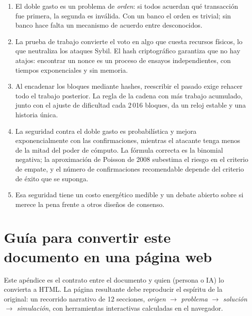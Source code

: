 \documentclass[11pt,a4paper]{article}
\newcommand{\webhint}[1]{}
\begin{document}
\begin{enumerate}[leftmargin=1.6em,itemsep=3pt]
  \item El doble gasto es un problema de \emph{orden}: si todos acuerdan qué transacción fue primera, la segunda es inválida. Con un banco el orden es trivial; sin banco hace falta un mecanismo de acuerdo entre desconocidos.
  \item La prueba de trabajo convierte el voto en algo que cuesta recursos físicos, lo que neutraliza los ataques Sybil. El hash criptográfico garantiza que no hay atajos: encontrar un nonce es un proceso de ensayos independientes, con tiempos exponenciales y sin memoria.
  \item Al encadenar los bloques mediante hashes, reescribir el pasado exige rehacer todo el trabajo posterior. La regla de la cadena con más trabajo acumulado, junto con el ajuste de dificultad cada 2\,016 bloques, da un reloj estable y una historia única.
  \item La seguridad contra el doble gasto es probabilística y mejora exponencialmente con las confirmaciones, mientras el atacante tenga menos de la mitad del poder de cómputo. La fórmula correcta es la binomial negativa; la aproximación de Poisson de 2008 subestima el riesgo en el criterio de empate, y el número de confirmaciones recomendable depende del criterio de éxito que se suponga.
  \item Esa seguridad tiene un costo energético medible y un debate abierto sobre si merece la pena frente a otros diseños de consenso.
\end{enumerate}

\appendix

\section{Guía para convertir este documento en una página web}\label{app:web}
\webhint{section; id=app-web; slug=guia-web; kicker=apéndice; role=meta; render=false}

Este apéndice es el contrato entre el documento y quien (persona o IA) lo convierta a HTML. La página resultante debe reproducir el espíritu de la original: un recorrido narrativo de 12 secciones, \emph{origen $\rightarrow$ problema $\rightarrow$ solución $\rightarrow$ simulación}, con herramientas interactivas calculadas en el navegador.
\end{document}
